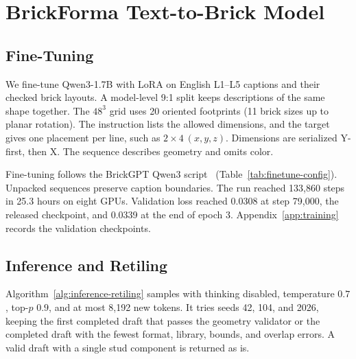 \documentclass[letterpaper]{article} %
\begin{document}
\section{BrickForma Text-to-Brick Model}
\label{sec:model}
\subsection{Fine-Tuning}
\label{sec:training}
We fine-tune Qwen3-1.7B with LoRA on English L1--L5 captions and their checked brick layouts. A model-level 9:1 split keeps descriptions of the same shape together. The $48^3$ grid uses 20 oriented footprints (11 brick sizes up to planar rotation). The instruction lists the allowed dimensions, and the target gives one placement per line, such as $2{\times}4\ (x,y,z)$. Dimensions are serialized Y-first, then X. The sequence describes geometry and omits color.

Fine-tuning follows the BrickGPT Qwen3 script~\cite{brickgpt} (Table~\ref{tab:finetune-config}). Unpacked sequences preserve caption boundaries. The run reached 133,860 steps in 25.3 hours on eight GPUs. Validation loss reached 0.0308 at step 79,000, the released checkpoint, and 0.0339 at the end of epoch 3. Appendix~\ref{app:training} records the validation checkpoints.


\subsection{Inference and Retiling}
Algorithm~\ref{alg:inference-retiling} samples with thinking disabled, temperature $0.7$, top-$p$ $0.9$, and at most 8,192 new tokens. It tries seeds 42, 104, and 2026, keeping the first completed draft that passes the geometry validator or the completed draft with the fewest format, library, bounds, and overlap errors. A valid draft with a single stud component is returned as is.
\end{document}
